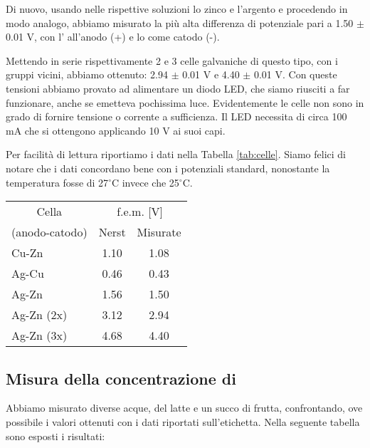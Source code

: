 Di nuovo, usando nelle rispettive soluzioni lo zinco e l'argento e procedendo in modo analogo,
abbiamo misurato la più alta differenza di potenziale pari a 1.50 $\pm$ 0.01 V,
con l' all'anodo (+) e lo  come catodo (-).

Mettendo in serie rispettivamente 2 e 3 celle galvaniche di questo tipo, con i gruppi vicini,
abbiamo ottenuto: 2.94 $\pm$ 0.01 V e 4.40 $\pm$ 0.01 V. Con queste tensioni abbiamo provato ad alimentare un
diodo LED, che siamo riusciti a far funzionare, anche se emetteva pochissima luce. Evidentemente
le celle non sono in grado di fornire tensione o corrente a sufficienza. Il LED necessita di circa 100 mA
che si ottengono applicando 10 V ai suoi capi.

Per facilità di lettura riportiamo i dati nella Tabella \ref{tab:celle}. Siamo felici di notare che i dati concordano bene
con i potenziali standard, nonostante la temperatura fosse di 27$^\circ$C invece che 25$^\circ$C. 

\begin{SCtable}[1][h]
    \centering
    \begin{tabular}{l c c}
        \toprule
        \multicolumn{1}{c}{Cella} & \multicolumn{2}{c}{f.e.m. [V]} \\
        (anodo-catodo) & Nerst & Misurate \\
        \midrule
        Cu-Zn & 1.10 & 1.08 \\
        Ag-Cu & 0.46 & 0.43 \\
        Ag-Zn & 1.56 & 1.50 \\
        Ag-Zn (2x) & 3.12 & 2.94 \\
        Ag-Zn (3x) & 4.68 & 4.40 \\
        \bottomrule
    \end{tabular}
    \caption{Forze elettromotrici misurate con il multimetro. Nella prima colonna abbiamo riportato le coppie di metalli
    secondo la convezione anodo-catodo. I (2x) e (3x) indicano il numero di celle in serie. Le incertezze sono di 0.01 V.}
    \label{tab:celle}
\end{SCtable}

\subsection*{Misura della concentrazione di }

Abbiamo misurato diverse acque, del latte e un succo di frutta, confrontando, ove possibile i valori ottenuti con i dati riportati sull'etichetta. Nella seguente tabella sono esposti i risultati:

